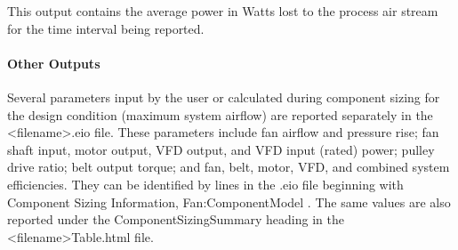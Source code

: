 This output contains the average power in Watts lost to the process air stream for the time interval being reported.

\paragraph{Other Outputs}\label{other-outputs}

Several parameters input by the user or calculated during component sizing for the design condition (maximum system airflow) are reported separately in the \textless{}filename\textgreater{}.eio file. These parameters include fan airflow and pressure rise; fan shaft input, motor output, VFD output, and VFD input (rated) power; pulley drive ratio; belt output torque; and fan, belt, motor, VFD, and combined system efficiencies. They can be identified by lines in the .eio file beginning with Component Sizing Information, Fan:ComponentModel . The same values are also reported under the ComponentSizingSummary heading in the \textless{}filename\textgreater{}Table.html file.
